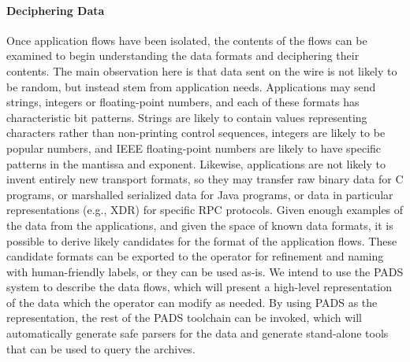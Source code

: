 \paragraph*{Deciphering Data} Once application flows have been isolated, the
contents of the flows can be examined to begin understanding the data
formats and deciphering their contents. The main observation here is that
data sent on the wire is not likely to be random, but instead stem
from application needs. Applications may send strings, integers or
floating-point numbers, and each of these formats has
characteristic bit patterns. Strings are likely to contain
values representing characters rather than non-printing control
sequences, integers are likely to be popular numbers,
and IEEE floating-point numbers are likely to have specific patterns
in the mantissa and exponent.  Likewise, applications are not likely
to invent entirely new transport formats, so they may transfer raw
binary data for C programs, or marshalled serialized data for Java
programs, or data in particular representations (e.g., XDR) for
specific RPC protocols. Given enough examples of the data from the
applications, and given the space of known data formats, it is
possible to derive likely candidates for the format of the application
flows. These candidate formats can be exported to the operator for
refinement and naming with human-friendly labels, or they can be used
as-is. We intend to use the PADS system to describe the data flows,
which will present a high-level representation of the data which the
operator can modify as needed. By using PADS as the representation,
the rest of the PADS toolchain can be invoked, which will
automatically generate safe parsers for the data and generate
stand-alone tools that can be used to query the archives.

